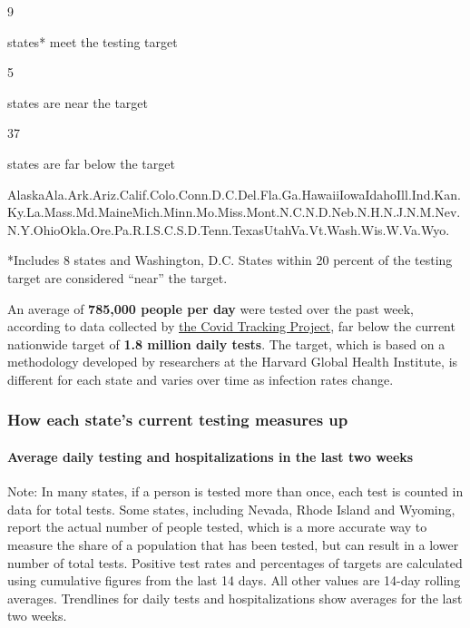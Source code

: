 9

states* meet the testing target

5

states are near the target

37

states are far below the target

AlaskaAla.Ark.Ariz.Calif.Colo.Conn.D.C.Del.Fla.Ga.HawaiiIowaIdahoIll.Ind.Kan.Ky.La.Mass.Md.MaineMich.Minn.Mo.Miss.Mont.N.C.N.D.Neb.N.H.N.J.N.M.Nev.N.Y.OhioOkla.Ore.Pa.R.I.S.C.S.D.Tenn.TexasUtahVa.Vt.Wash.Wis.W.Va.Wyo.

*Includes 8 states and Washington, D.C. States within 20 percent of the
testing target are considered ``near'' the target.

An average of \textbf{785,000 people per day} were tested over the past
week, according to data collected by
\href{https://covidtracking.com/}{the Covid Tracking Project}, far below
the current nationwide target of \textbf{1.8 million daily tests}. The
target, which is based on a methodology developed by researchers at the
Harvard Global Health Institute, is different for each state and varies
over time as infection rates change.

\hypertarget{how-each-states-current-testing-measures-up}{%
\subsubsection{How each state's current testing measures
up}\label{how-each-states-current-testing-measures-up}}

\hypertarget{average-daily-testing-and-hospitalizations-in-the-last-two-weeks}{%
\paragraph{Average daily testing and hospitalizations in the last two
weeks}\label{average-daily-testing-and-hospitalizations-in-the-last-two-weeks}}

Note: In many states, if a person is tested more than once, each test is
counted in data for total tests. Some states, including Nevada, Rhode
Island and Wyoming, report the actual number of people tested, which is
a more accurate way to measure the share of a population that has been
tested, but can result in a lower number of total tests. Positive test
rates and percentages of targets are calculated using cumulative figures
from the last 14 days. All other values are 14-day rolling averages.
Trendlines for daily tests and hospitalizations show averages for the
last two weeks.

